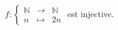 $f:\left\{\begin{array}{ccc}\mathbb{N} & \to & \mathbb{N} \\n & \mapsto & 2n\end{array}\right.$ est injective.

\begin{reponses}
\end{reponses}

